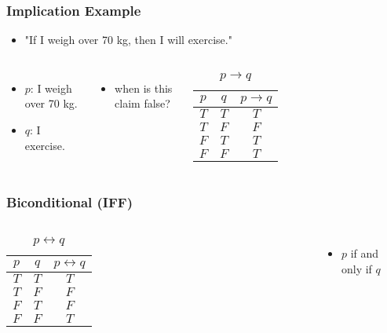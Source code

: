 \documentclass[dvipsnames]{beamer}
\begin{document}
\begin{frame}
  \frametitle{Implication Example}

  \begin{itemize}
    \item "If I weigh over 70 kg, then I will exercise."
  \end{itemize}

  \pause
  \begin{columns}
    \begin{itemize}
      \item $p$: I weigh over 70 kg.
      \item $q$: I exercise.
    \end{itemize}

    \pause
    \begin{itemize}
      \item when is this claim false?
    \end{itemize}

    \begin{table}
      \caption{$p \rightarrow q$}
      \begin{tabular}{|c|c||c|}\hline
        $p$ & $q$ & $p \rightarrow q$\\\hline\hline
        $T$ & $T$ & $T$\\\hline
        $T$ & $F$ & $F$\\\hline
        $F$ & $T$ & $T$\\\hline
        $F$ & $F$ & $T$\\\hline
      \end{tabular}
    \end{table}
  \end{columns}
\end{frame}

\begin{frame}
  \frametitle{Biconditional (IFF)}

  \begin{columns}
    \begin{table}
      \caption{$p \leftrightarrow q$}
      \begin{tabular}{|c|c||c|}\hline
        $p$ & $q$ & $p \leftrightarrow q$\\\hline\hline
        $T$ & $T$ & $T$\\\hline
        $T$ & $F$ & $F$\\\hline
        $F$ & $T$ & $F$\\\hline
        $F$ & $F$ & $T$\\\hline
      \end{tabular}
    \end{table}

    \begin{itemize}
      \item $p$ if and only if $q$
    \end{itemize}
  \end{columns}
\end{frame}
\end{document}
